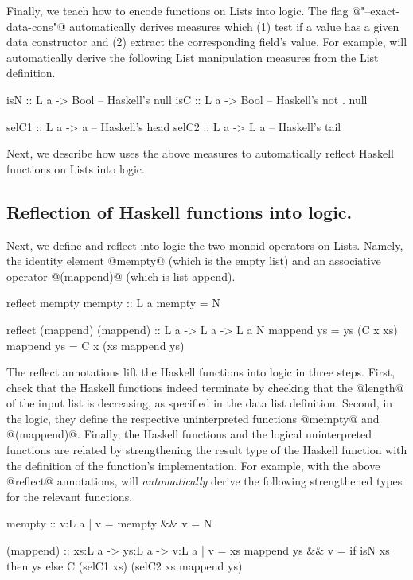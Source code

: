 Finally, we teach \toolname how to encode functions on Lists
into logic.
%
The flag @"--exact-data-cons"@
automatically derives measures which
(1) test if a value has a given data constructor and
(2) extract the corresponding field's value.
%
For example, \toolname will automatically derive the following
List manipulation measures from the List definition.
\begin{code}
  isN :: L a -> Bool    -- Haskell's null
  isC :: L a -> Bool    -- Haskell's not . null

  selC1 :: L a -> a     -- Haskell's head
  selC2 :: L a -> L a   -- Haskell's tail
\end{code}
%
Next, we describe how \toolname uses the above measures
to automatically reflect Haskell functions on Lists into logic.

\subsection{Reflection of Haskell functions into logic.}
Next, we define and reflect into logic the two monoid operators on Lists.
Namely, the identity element @mempty@ (which is the empty list)
and an associative operator @(mappend)@ (which is list append).
%
\begin{code}
  reflect mempty
  mempty :: L a
  mempty = N

  reflect (mappend)
  (mappend) :: L a -> L a -> L a
  N        mappend ys = ys
  (C x xs) mappend ys = C x (xs mappend ys)
\end{code}

The reflect annotations lift the Haskell functions into logic in three steps.
%
First, check that the Haskell functions indeed terminate by checking
that the @length@ of the input list is decreasing,
as specified in the data list definition.
%
Second, in the logic, they define the respective uninterpreted functions
@mempty@ and @(mappend)@.
%
Finally, the Haskell functions and the logical uninterpreted functions
are related by strengthening the result type of the Haskell function
with the definition of the function's implementation.
%
For example, with the above @reflect@ annotations,
\toolname will \textit{automatically} derive the following strengthened
types for the relevant functions.
\begin{code}
  mempty  :: {v:L a | v = mempty && v = N }

  (mappend) :: xs:L a -> ys:L a
      -> {v:L a | v = xs mappend ys
                && v = if isN xs then ys
                      else C (selC1 xs) (selC2 xs mappend ys)
         }
\end{code}

